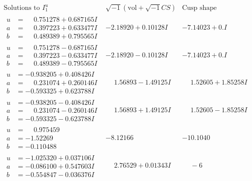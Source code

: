 \documentclass[1p]{elsarticle_modified}
\theoremstyle{definition}
\newcommand{\I}{\sqrt{-1}}
\begin{document}
$$\begin{array}{c|c|c}  
\text{Solutions to }I^u_{1}& \I (\text{vol} + \sqrt{-1}CS) & \text{Cusp shape}\\
 \hline 
\begin{aligned}
u &= \phantom{-}0.751278 + 0.687165 I \\
a &= \phantom{-}0.397223 + 0.633477 I \\
b &= \phantom{-}0.489389 + 0.795565 I\end{aligned}
 & -2.18920 + 0.10128 I & -7.14023 + 0. I\phantom{ +0.000000I} \\ \hline\begin{aligned}
u &= \phantom{-}0.751278 - 0.687165 I \\
a &= \phantom{-}0.397223 - 0.633477 I \\
b &= \phantom{-}0.489389 - 0.795565 I\end{aligned}
 & -2.18920 - 0.10128 I & -7.14023 + 0. I\phantom{ +0.000000I} \\ \hline\begin{aligned}
u &= -0.938205 + 0.408426 I \\
a &= \phantom{-}0.231074 + 0.260146 I \\
b &= -0.593325 + 0.623788 I\end{aligned}
 & \phantom{-}1.56893 - 1.49125 I & \phantom{-}1.52605 + 1.85258 I \\ \hline\begin{aligned}
u &= -0.938205 - 0.408426 I \\
a &= \phantom{-}0.231074 - 0.260146 I \\
b &= -0.593325 - 0.623788 I\end{aligned}
 & \phantom{-}1.56893 + 1.49125 I & \phantom{-}1.52605 - 1.85258 I \\ \hline\begin{aligned}
u &= \phantom{-}0.975459\phantom{ +0.000000I} \\
a &= -1.52269\phantom{ +0.000000I} \\
b &= -0.110488\phantom{ +0.000000I}\end{aligned}
 & -8.12166\phantom{ +0.000000I} & -10.1040\phantom{ +0.000000I} \\ \hline\begin{aligned}
u &= -1.025320 + 0.037106 I \\
a &= -0.086100 + 0.547603 I \\
b &= -0.554847 - 0.036376 I\end{aligned}
 & \phantom{-}2.76529 + 0.01343 I & \phantom{-}                -6

\end{array}$$
\end{document}
